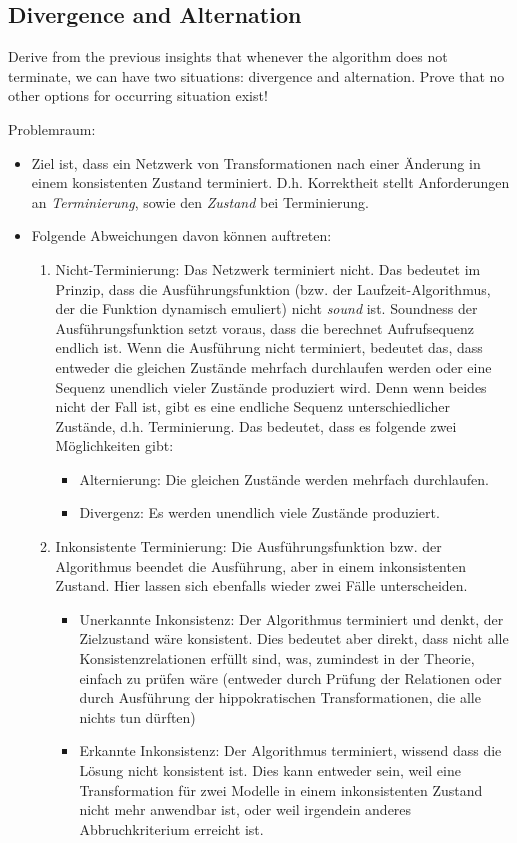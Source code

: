 \subsection{Divergence and Alternation}

Derive from the previous insights that whenever the algorithm does not terminate, we can have two situations: divergence and alternation.
Prove that no other options for occurring situation exist!

Problemraum:
\begin{itemize}
    \item Ziel ist, dass ein Netzwerk von Transformationen nach einer Änderung in einem konsistenten Zustand terminiert. D.h. Korrektheit stellt Anforderungen an \emph{Terminierung}, sowie den \emph{Zustand} bei Terminierung.
    \item Folgende Abweichungen davon können auftreten:
    \begin{enumerate}
        \item Nicht-Terminierung: Das Netzwerk terminiert nicht. Das bedeutet im Prinzip, dass die Ausführungsfunktion (bzw. der Laufzeit-Algorithmus, der die Funktion dynamisch emuliert) nicht \emph{sound} ist. Soundness der Ausführungsfunktion setzt voraus, dass die berechnet Aufrufsequenz endlich ist. Wenn die Ausführung nicht terminiert, bedeutet das, dass entweder die gleichen Zustände mehrfach durchlaufen werden oder eine Sequenz unendlich vieler Zustände produziert wird. Denn wenn beides nicht der Fall ist, gibt es eine endliche Sequenz unterschiedlicher Zustände, d.h. Terminierung. Das bedeutet, dass es folgende zwei Möglichkeiten gibt:
        \begin{itemize}
            \item Alternierung: Die gleichen Zustände werden mehrfach durchlaufen.
            \item Divergenz: Es werden unendlich viele Zustände produziert.
        \end{itemize}
        \item Inkonsistente Terminierung: Die Ausführungsfunktion bzw. der Algorithmus beendet die Ausführung, aber in einem inkonsistenten Zustand. Hier lassen sich ebenfalls wieder zwei Fälle unterscheiden.
        \begin{itemize}
            \item Unerkannte Inkonsistenz: Der Algorithmus terminiert und denkt, der Zielzustand wäre konsistent. Dies bedeutet aber direkt, dass nicht alle Konsistenzrelationen erfüllt sind, was, zumindest in der Theorie, einfach zu prüfen wäre (entweder durch Prüfung der Relationen oder durch Ausführung der hippokratischen Transformationen, die alle nichts tun dürften)
            \item Erkannte Inkonsistenz: Der Algorithmus terminiert, wissend dass die Lösung nicht konsistent ist. Dies kann entweder sein, weil eine Transformation für zwei Modelle in einem inkonsistenten Zustand nicht mehr anwendbar ist, oder weil irgendein anderes Abbruchkriterium erreicht ist.
        \end{itemize}
    \end{enumerate}
\end{itemize}

